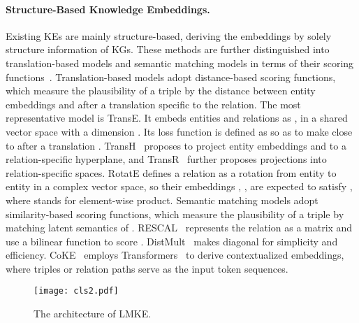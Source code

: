 \documentclass{article}
\begin{document}
\paragraph{\textbf{Structure-Based Knowledge Embeddings.}}  
Existing KEs are mainly structure-based, deriving the embeddings by solely structure information of KGs.
These methods are further distinguished into translation-based models and semantic matching models in terms of their scoring functions~\cite{wang2017knowledge}. 
Translation-based models adopt distance-based scoring functions, which measure the plausibility of a triple   by the distance between entity embeddings  and  after a translation specific to the relation.   
The most representative model is TransE. 
It embeds entities and relations as ,  in a shared vector space with a dimension .
Its loss function is defined as  so as to make  close to  after a translation . 
TransH~\cite{wang2014transh} proposes to project entity embeddings  and  to a relation-specific hyperplane, and TransR~\cite{lin2015transr} further proposes projections into relation-specific spaces.
RotatE defines a relation as a rotation from entity  to entity  in a complex vector space, so their embeddings , ,  are expected to satisfy , where  stands for element-wise product.
Semantic matching models adopt similarity-based scoring functions, which measure the plausibility of a triple  by matching latent semantics of .
RESCAL~\cite{nickel2011rescal} represents the relation  as a matrix  and use a bilinear function  to score . 
DistMult~\cite{yang2014distmult} makes  diagonal for simplicity and efficiency. 
CoKE~\cite{wang2019coke} employs Transformers~\cite{vaswani2017attention} to derive contextualized embeddings, where triples or relation paths serve as the input token sequences. 


\begin{figure*}[htbp]
  \centering
  \texttt{[image: cls2.pdf]}
\caption{The architecture of LMKE.}
  \label{fig:triple_classification}
\end{figure*}
\end{document}
